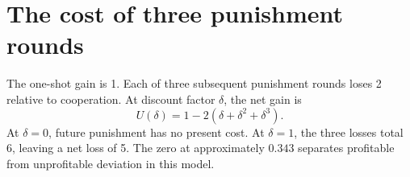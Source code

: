 \documentclass[11pt,a4paper,twoside]{article}
\begin{document}
\section*{The cost of three punishment rounds}
The one-shot gain is 1. Each of three subsequent punishment rounds loses 2
relative to cooperation. At discount factor $\delta$, the net gain is
\[U(\delta)=1-2(\delta+\delta^2+\delta^3).\]
At $\delta=0$, future punishment has no present cost. At $\delta=1$, the
three losses total 6, leaving a net loss of 5. The zero at approximately
$0.343$ separates profitable from unprofitable deviation in this model.
\end{document}
